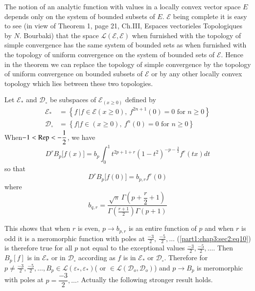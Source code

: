 \begin{remark*}
  The notion of an analytic function with values in a locally convex
  vector space $E$ depends only on the system of bounded subsets of
  $E$. $\mathscr{E}$ being complete it is easy to see (in view of
  Theorem 1, page 21, Ch.III,  Espaces vectorieles  Topologiques
  by $N$. Bourbaki) that the space $\mathscr{L} (\mathscr{E},
  \mathscr{E})$ when furnished with the topology of simple
  convergence has the same system of bounded sets as when furnished
  with the topology of  uniform convergence on the system of bounded
  sets of $\mathscr{E}$. Hence in the theorem we can replace the
  topology of simple convergence by the topology of uniform
  convergence on bounded subsets of $\mathscr{E}$ or by any other
  locally convex topology which lies between these two topologies. 
\end{remark*}

Let $\mathscr{E}_*$ and $\mathscr{D}_\circ$ be subspaces of
$\mathscr{E}_{(x \geq 0)}$ defined by  
\begin{align*}
  \mathscr{E}_* &= \left\{ f \,| f \in \mathscr{E}(x \geq 0), ~ f^{2n+1}
  (0) = 0 \text{ for } n \geq 0 \right\} \\ 
  \mathscr{D}_\circ &= \left\{ f | f \in (x \geq 0), ~ f^n (0) = 0
  \text{ for } n \geq 0 \right \}  
\end{align*}
When\pageoriginale $-1 < \operatorname{Rep} < -\dfrac{1}{2}$, we have
$$
D^r B_p \big[ f (x) \big] = b_p \int^1_0 t^{2p+1+r}
{(1-t^2)}^{-p-\frac{3}{2}} f^r (tx) dt 
$$
so that 
\begin{equation}
  D^r B_p \big[ f (0) \big] = b_{p, r} f^r (0)
  \tag{10}\label{part1:chap3:sec2:eq10} 
\end{equation}
where
$$
b_{q, r}= \frac{\sqrt{\pi} \,\Gamma \left(p+ \dfrac{r}{2} +1\right)}{\Gamma
  \left(\frac{r+1}{2}\right) \Gamma (p+1)} 
$$

This shows that when $r$ is even, $p \to b_{p, r}$ is an entire
function of $p$ and when $r$ is odd it is a meromorphic function with
poles at $\frac{-3}{2}, ~ \frac{-5}{2},  \ldots$ 
(\ref{part1:chap3:sec2:eq10}) is therefore
true for all $p$ not equal to the exceptional values $\frac{-3}{2},
\frac{-5}{2},  \ldots $. Then $B_p [f]$ is in $\mathscr{E}_*$ or in
$\mathscr{D}_\circ$ according as $f$ is in $\mathscr{E}_*$ or
$\mathscr{D}_\circ$. Therefore for $p \neq \frac{-3}{2}, \frac{-5}{2},
\ldots,  B_p \in \mathscr{L} (\varepsilon_*, \varepsilon_*)$( or $\in
\mathscr{L}(\mathscr{D}_o,  \mathscr{D}_o )$) and $p \to B_p$ is
meromorphic with poles at $p= \dfrac{-3}{2},\ldots$. Actually the
following stronger result holds. 

